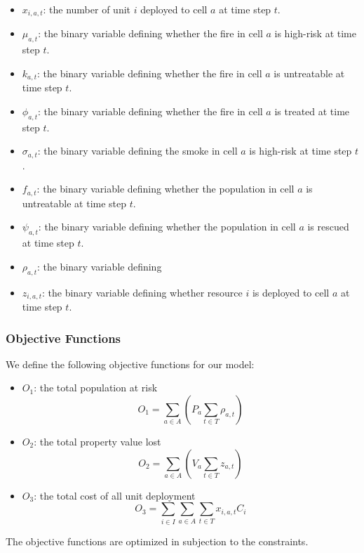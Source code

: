 \begin{itemize}
    \item $x_{i,a,t}$: the number of unit $i$ deployed to cell $a$ at time step $t$.
    
    \item $\mu_{a,t}$: the binary variable defining whether the fire in cell $a$ is high-risk at time step $t$.
    \item $k_{a,t}$: the binary variable defining whether the fire in cell $a$ is untreatable at time step $t$.
    \item $\phi_{a,t}$: the binary variable defining whether the fire in cell $a$ is treated at time step $t$.

    \item $\sigma_{a,t}$: the binary variable defining the smoke in cell $a$ is high-risk at time step $t$.
    \item $f_{a,t}$: the binary variable defining whether the population in cell $a$ is untreatable at time step $t$.
    \item $\psi_{a,t}$: the binary variable defining whether the population in cell $a$ is rescued at time step $t$.
    
    \item $\rho_{a,t}$: the binary variable defining
    \item $z_{i,a,t}$: the binary variable defining whether resource $i$ is deployed to cell $a$ at time step $t$.
\end{itemize}

\subsubsection{Objective Functions}
We define the following objective functions for our model:

\begin{itemize}
    \item $O_1$: the total population at risk
    $$O_1 = \sum_{a \in A} (P_a \sum_{t \in T} \rho_{a,t} ) $$

    \item $O_2$: the total property value lost
    $$O_2 = \sum_{a \in A} (V_a \sum_{t \in T} z_{a,t} ) $$

    \item $O_3$: the total cost of all unit deployment
    $$O_3 = \sum_{i \in I} \sum_{a \in A} \sum_{t \in T} x_{i,a,t} C_i $$
\end{itemize}

The objective functions are optimized in subjection to the constraints. 

